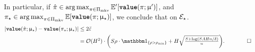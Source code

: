 In particular, if $\hat{\pi} \in \operatorname*{arg\,max}_{\pi \in \Pi_{\mathrm{mkv}}}\mathbb{E}'[{\normalfont \texttt{\textbf{value}}}(\pi;\upmu') ]$, and $\pi_{\star} \in \operatorname*{arg\,max}_{\pi \in \Pi_{\mathrm{mkv}}}\mathbb{E}[{\normalfont \texttt{\textbf{value}}}(\pi;\upmu_{\star}) ]$, we conclude that on $\mathcal{E}_{\star}$.
\begin{align*}
 |\valuef{\hat{\pi}}{\modst} - \valuef{\pi_{\star}}{\modst}| &\le 2\bar{\varepsilon} \\
 &= {\textstyle \mathcal{O}(H^2)\cdot\left(S \rho \cdot \ind_{\{\rho > \rho_{\min}\}}+ H\sqrt{\frac{S + \log(SAHn/\delta)}{n}}\right)}.\qquad\qed
\end{align*}



\begin{comment}


Under the assumptions of the lemma (and for our choices of $\delta_1,\delta_2)$, we have $\rho \le \max\{\frac{\epsilon}{8SH^2},\rho_{\min}\}$, $\delta_2 = \frac{\epsilon}{8H}$, and  $\epsp(n,\delta_1) \le \frac{\epsilon}{24H^3}$ (as one can check)\footnote{Recall $\epsp(n,\delta):= 2\sqrt{ \frac{2(S\log(5) + \log(1/\delta))}{n}}$. Plugging in $\delta \gets \delta_1 = \epsilon \delta/48H,$, we need
$ \epsp(n,\delta_1):= 2\sqrt{ \frac{2(S\log(5) + \log(\frac{48H}{\epsilon\delta} ))}{n}} \le  \frac{\epsilon}{24H^3}.$
This holds for $n \ge 1152H^3\epsilon^{-2}(S\log 5 + \log \tfrac{18 H}{\epsilon\delta} )$, the condition stated in the proposition.} Thus,
\begin{align*}
|\Exp'[\valuef{\pi}{\model'} ] - \valuef{\pi}{\modst}| \le \frac{\epsilon}{2}
\end{align*}
In particular, if $\pi \in \argmax_{\pi' \in \Pimarkov}\Exp'[\valuef{\pi'}{\model'} ]$ is BIC, then an application of the triangle inequality
\begin{align*}
\valuef{\pi}{\modst} \ge \max_{\pi'}\valuef{\pi}{\modst} - 2\cdot\frac{\epsilon}{2} = \OPT(\modst) -\epsilon.
\end{align*}
\end{comment}
